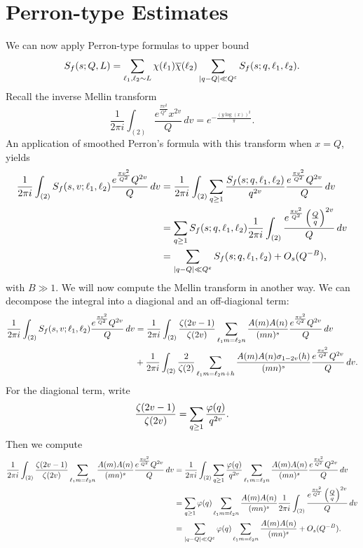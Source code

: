 \documentclass[12pt,reqno,oneside]{amsart}
\begin{document}
\section{Perron-type Estimates}
  We can now apply Perron-type formulas to upper bound
  \[
    S_{f}(s;Q,L) = \sum_{\ell_{1},\ell_{2} \sim L}\chi(\ell_{1})\overline{\chi}(\ell_{2})\sum_{|q-Q| \ll Q^{\varepsilon}}S_{f}(s;q,\ell_{1},\ell_{2}).
  \]
  Recall the inverse Mellin transform
  \[
    \frac{1}{2\pi i}\int_{(2)}\frac{e^{\frac{\pi v^{2}}{Q^{2}}}x^{2v}}{Q}\,dv = e^{-\frac{(y\log(x))^{2}}{\pi}}.
  \]
  An application of smoothed Perron's formula with this transform when $x = Q$, yields
  \begin{align*}
    \frac{1}{2\pi i}\int_{(2)}S_{f}(s,v;\ell_{1},\ell_{2})\frac{e^{\frac{\pi v^{2}}{Q^{2}}}Q^{2v}}{Q}\,dv &= \frac{1}{2\pi i}\int_{(2)}\sum_{q \ge 1}\frac{S_{f}(s;q,\ell_{1},\ell_{2})}{q^{2v}}\frac{e^{\frac{\pi v^{2}}{Q^{2}}}Q^{2v}}{Q}\,dv \\
    &= \sum_{q \ge 1}S_{f}(s;q,\ell_{1},\ell_{2})\frac{1}{2\pi i}\int_{(2)}\frac{e^{\frac{\pi v^{2}}{Q^{2}}}\left(\frac{Q}{q}\right)^{2v}}{Q}\,dv \\
    &= \sum_{|q-Q| \ll Q^{\varepsilon}}S_{f}(s;q,\ell_{1},\ell_{2})+O_{s}(Q^{-B}),
  \end{align*}
  with $B \gg 1$. We will now compute the Mellin transform in another way. We can decompose the integral into a diagional and an off-diagional term:
  \begin{align*}
    \frac{1}{2\pi i}\int_{(2)}S_{f}(s,v;\ell_{1},\ell_{2})\frac{e^{\frac{\pi v^{2}}{Q^{2}}}Q^{2v}}{Q}\,dv &= \frac{1}{2\pi i}\int_{(2)}\frac{\zeta(2v-1)}{\zeta(2v)}\sum_{\ell_{1}m = \ell_{2}n}\frac{A(m)A(n)}{(mn)^{s}}\frac{e^{\frac{\pi v^{2}}{Q^{2}}}Q^{2v}}{Q}\,dv \\
    &+ \frac{1}{2\pi i}\int_{(2)}\frac{2}{\zeta(2)}\sum_{\ell_{1}m = \ell_{2}n+h}\frac{A(m)A(n)\sigma_{1-2v}(h)}{(mn)^{s}}\frac{e^{\frac{\pi v^{2}}{Q^{2}}}Q^{2v}}{Q}\,dv.
  \end{align*}
  For the diagional term, write
  \[
    \frac{\zeta(2v-1)}{\zeta(2v)} = \sum_{q \ge 1}\frac{\varphi(q)}{q^{2v}}.
  \]
  Then we compute
  \begin{align*}
    \frac{1}{2\pi i}\int_{(2)}\frac{\zeta(2v-1)}{\zeta(2v)}\sum_{\ell_{1}m = \ell_{2}n}\frac{A(m)A(n)}{(mn)^{s}}\frac{e^{\frac{\pi v^{2}}{Q^{2}}}Q^{2v}}{Q}\,dv &= \frac{1}{2\pi i}\int_{(2)}\sum_{q \ge 1}\frac{\varphi(q)}{q^{2v}}\sum_{\ell_{1}m = \ell_{2}n}\frac{A(m)A(n)}{(mn)^{s}}\frac{e^{\frac{\pi v^{2}}{Q^{2}}}Q^{2v}}{Q}\,dv \\
    &= \sum_{q \ge 1}\varphi(q)\sum_{\ell_{1}m = \ell_{2}n}\frac{A(m)A(n)}{(mn)^{s}}\frac{1}{2\pi i}\int_{(2)}\frac{e^{\frac{\pi v^{2}}{Q^{2}}}\left(\frac{Q}{q}\right)^{2v}}{Q}\,dv \\
    &= \sum_{|q-Q| \ll Q^{\varepsilon}}\varphi(q)\sum_{\ell_{1}m = \ell_{2}n}\frac{A(m)A(n)}{(mn)^{s}}+O_{s}(Q^{-B}).
  \end{align*}
\end{document}
